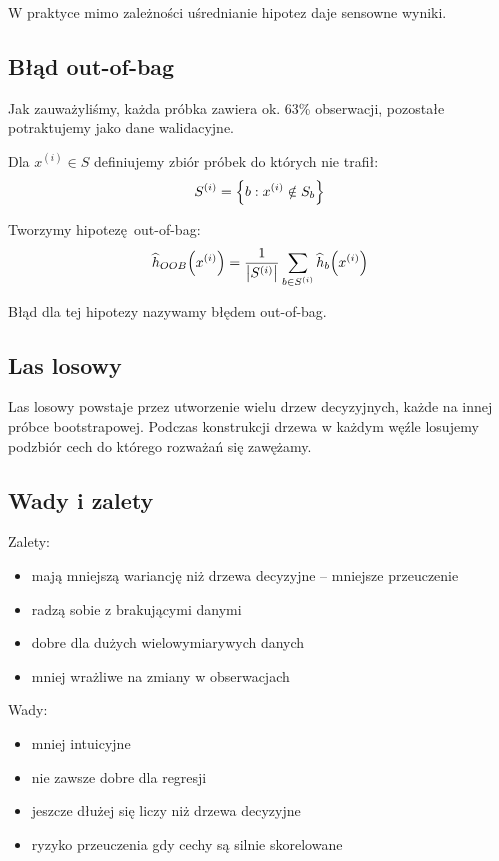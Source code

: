 W praktyce mimo zależności uśrednianie hipotez daje sensowne wyniki.

\subsection{Błąd out-of-bag}

Jak zauważyliśmy, każda próbka zawiera ok. 63\% obserwacji, pozostałe potraktujemy jako dane walidacyjne.

Dla \( x^{(i)} \in S \) definiujemy zbiór próbek do których nie trafił:
\[
    S^{(i)} = \set{b : x^{(i)} \notin S_b}
\]

Tworzymy hipotezę out-of-bag:
\[
    \widehat h_{OOB}\pars{x^{(i)}} = \frac{1}{\card{S^{(i)}}} \sum_{b \in S^{(i)}} \widehat h_b\pars{x^{(i)}}
\]

Błąd dla tej hipotezy nazywamy błędem out-of-bag.

\subsection{Las losowy}
Las losowy powstaje przez utworzenie wielu drzew decyzyjnych, każde na innej próbce bootstrapowej.
Podczas konstrukcji drzewa w każdym węźle losujemy podzbiór cech do którego rozważań się zawężamy.


\subsection{Wady i zalety}

Zalety:
\begin{itemize}
    \item mają mniejszą wariancję niż drzewa decyzyjne -- mniejsze przeuczenie
    \item radzą sobie z brakującymi danymi
    \item dobre dla dużych wielowymiarywych danych
    \item mniej wrażliwe na zmiany w obserwacjach
\end{itemize}

Wady:
\begin{itemize}
    \item mniej intuicyjne
    \item nie zawsze dobre dla regresji
    \item jeszcze dłużej się liczy niż drzewa decyzyjne
    \item ryzyko przeuczenia gdy cechy są silnie skorelowane
\end{itemize}